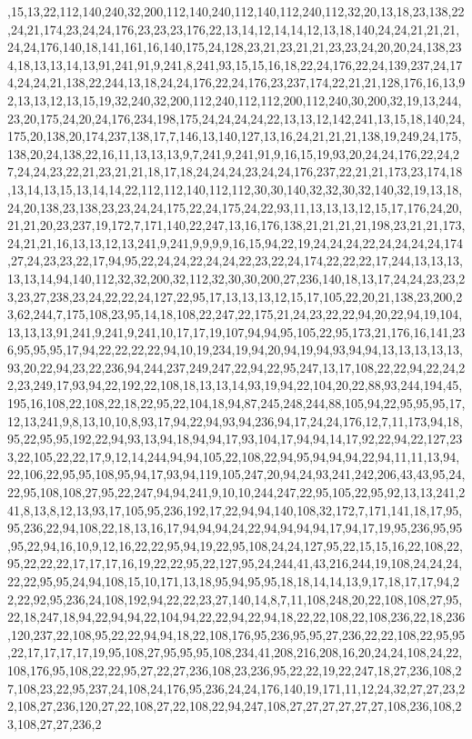 ,15,13,22,112,140,240,32,200,112,140,240,112,140,112,240,112,32,20,13,18,23,138,22,24,21,174,23,24,24,176,23,23,23,176,22,13,14,12,14,14,12,13,18,140,24,24,21,21,21,24,24,176,140,18,141,161,16,140,175,24,128,23,21,23,21,21,23,23,24,20,20,24,138,234,18,13,13,14,13,91,241,91,9,241,8,241,93,15,15,16,18,22,24,176,22,24,139,237,24,174,24,24,21,138,22,244,13,18,24,24,176,22,24,176,23,237,174,22,21,21,128,176,16,13,92,13,13,12,13,15,19,32,240,32,200,112,240,112,112,200,112,240,30,200,32,19,13,244,23,20,175,24,20,24,176,234,198,175,24,24,24,24,22,13,13,12,142,241,13,15,18,140,24,175,20,138,20,174,237,138,17,7,146,13,140,127,13,16,24,21,21,21,138,19,249,24,175,138,20,24,138,22,16,11,13,13,13,9,7,241,9,241,91,9,16,15,19,93,20,24,24,176,22,24,27,24,24,23,22,21,23,21,21,18,17,18,24,24,24,23,24,24,176,237,22,21,21,173,23,174,18,13,14,13,15,13,14,14,22,112,112,140,112,112,30,30,140,32,32,30,32,140,32,19,13,18,24,20,138,23,138,23,23,24,24,175,22,24,175,24,22,93,11,13,13,13,12,15,17,176,24,20,21,21,20,23,237,19,172,7,171,140,22,247,13,16,176,138,21,21,21,21,198,23,21,21,173,24,21,21,16,13,13,12,13,241,9,241,9,9,9,9,16,15,94,22,19,24,24,24,22,24,24,24,24,174,27,24,23,23,22,17,94,95,22,24,24,22,24,24,22,23,22,24,174,22,22,22,17,244,13,13,13,13,13,14,94,140,112,32,32,200,32,112,32,30,30,200,27,236,140,18,13,17,24,24,23,23,23,23,27,238,23,24,22,22,24,127,22,95,17,13,13,13,12,15,17,105,22,20,21,138,23,200,23,62,244,7,175,108,23,95,14,18,108,22,247,22,175,21,24,23,22,22,94,20,22,94,19,104,13,13,13,91,241,9,241,9,241,10,17,17,19,107,94,94,95,105,22,95,173,21,176,16,141,236,95,95,95,17,94,22,22,22,22,94,10,19,234,19,94,20,94,19,94,93,94,94,13,13,13,13,13,93,20,22,94,23,22,236,94,244,237,249,247,22,94,22,95,247,13,17,108,22,22,94,22,24,22,23,249,17,93,94,22,192,22,108,18,13,13,14,93,19,94,22,104,20,22,88,93,244,194,45,195,16,108,22,108,22,18,22,95,22,104,18,94,87,245,248,244,88,105,94,22,95,95,95,17,12,13,241,9,8,13,10,10,8,93,17,94,22,94,93,94,236,94,17,24,24,176,12,7,11,173,94,18,95,22,95,95,192,22,94,93,13,94,18,94,94,17,93,104,17,94,94,14,17,92,22,94,22,127,233,22,105,22,22,17,9,12,14,244,94,94,105,22,108,22,94,95,94,94,94,22,94,11,11,13,94,22,106,22,95,95,108,95,94,17,93,94,119,105,247,20,94,24,93,241,242,206,43,43,95,24,22,95,108,108,27,95,22,247,94,94,241,9,10,10,244,247,22,95,105,22,95,92,13,13,241,241,8,13,8,12,13,93,17,105,95,236,192,17,22,94,94,140,108,32,172,7,171,141,18,17,95,95,236,22,94,108,22,18,13,16,17,94,94,94,24,22,94,94,94,94,17,94,17,19,95,236,95,95,95,22,94,16,10,9,12,16,22,22,95,94,19,22,95,108,24,24,127,95,22,15,15,16,22,108,22,95,22,22,22,17,17,17,16,19,22,22,95,22,127,95,24,244,41,43,216,244,19,108,24,24,24,22,22,95,95,24,94,108,15,10,171,13,18,95,94,95,95,18,18,14,14,13,9,17,18,17,17,94,22,22,92,95,236,24,108,192,94,22,22,23,27,140,14,8,7,11,108,248,20,22,108,108,27,95,22,18,247,18,94,22,94,94,22,104,94,22,22,94,22,94,18,22,22,108,22,108,236,22,18,236,120,237,22,108,95,22,22,94,94,18,22,108,176,95,236,95,95,27,236,22,22,108,22,95,95,22,17,17,17,17,19,95,108,27,95,95,95,108,234,41,208,216,208,16,20,24,24,108,24,22,108,176,95,108,22,22,95,27,22,27,236,108,23,236,95,22,22,19,22,247,18,27,236,108,27,108,23,22,95,237,24,108,24,176,95,236,24,24,176,140,19,171,11,12,24,32,27,27,23,22,108,27,236,120,27,22,108,27,22,108,22,94,247,108,27,27,27,27,27,27,108,236,108,23,108,27,27,236,2
